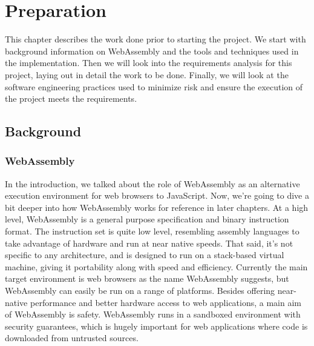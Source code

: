 \documentclass[12pt,a4paper,twoside,openright]{report}
\begin{document}
\chapter{Preparation}

This chapter describes the work done prior to starting the project.
We start with background information on WebAssembly and the tools and techniques used in the implementation.
Then we will look into the requirements analysis for this project, laying out in detail the work to be done.
Finally, we will look at the software engineering practices used to minimize risk and ensure the execution of the project meets the requirements.

\section{Background}
\subsection{WebAssembly}

In the introduction, we talked about the role of WebAssembly as an alternative execution environment for web browsers to JavaScript.
Now, we're going to dive a bit deeper into how WebAssembly works for reference in later chapters.
At a high level, WebAssembly is a general purpose specification and binary instruction format.
The instruction set is quite low level, resembling assembly languages to take advantage of hardware and run at near native speeds.
That said, it's not specific to any architecture, and is designed to run on a stack-based virtual machine, giving it portability along with speed and efficiency.
Currently the main target environment is web browsers as the name WebAssembly suggests, but WebAssembly can easily be run on a range of platforms.
Besides offering near-native performance and better hardware access to web applications, a main aim of WebAssembly is safety.
WebAssembly runs in a sandboxed environment with security guarantees, which is hugely important for web applications where code is downloaded from untrusted sources.
\end{document}

